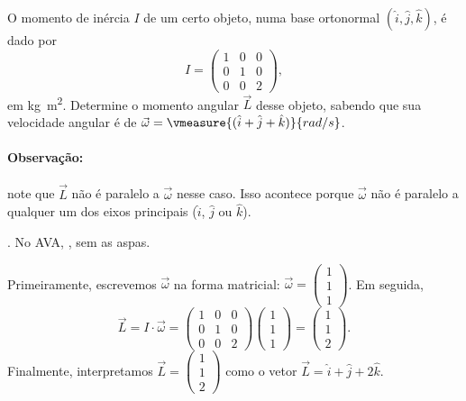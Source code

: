 \begin{question}
    O momento de inércia $I$ de um certo objeto, numa base ortonormal $(\hat i, \hat j, \hat k)$, é dado por
    \begin{equation}
      I =
        \begin{pmatrix}
          1 & 0 & 0 \\
          0 & 1 & 0 \\
          0 & 0 & 2
        \end{pmatrix},
    \end{equation}
    em \unit{kg.m^2}.
    Determine o momento angular $\vec L$ desse objeto, sabendo que sua velocidade angular é de $\vec \omega = \vmeasure{(\hat i + \hat j + \hat k)}{rad/s}$.

    \paragraph{Observação:} note que $\vec L$ não é paralelo a $\vec \omega$ nesse caso.
    Isso acontece porque $\vec\omega$ não é paralelo a qualquer um dos eixos principais ($\hat i$, $\hat j$ ou $\hat k$).

    \begin{answer}
      . No AVA, , sem as aspas.
    \end{answer}
    
    \begin{solution}
      Primeiramente, escrevemos $\vec\omega$ na forma matricial: $\vec\omega = \begin{pmatrix}1\\1\\1\end{pmatrix}$.
      Em seguida,
      \begin{equation*}
        \vec L = I \cdot \vec\omega =
          \begin{pmatrix}
            1 & 0 & 0 \\
            0 & 1 & 0 \\
            0 & 0 & 2
          \end{pmatrix}
          \begin{pmatrix}
            1 \\ 1 \\ 1
          \end{pmatrix}
        = \begin{pmatrix}
            1 \\ 1 \\ 2
          \end{pmatrix}.
      \end{equation*}
      Finalmente, interpretamos $\vec L = \begin{pmatrix}1\\1\\2\end{pmatrix}$ como o vetor $\vec L = \hat i + \hat j + 2\hat k$.
    \end{solution}
\end{question}